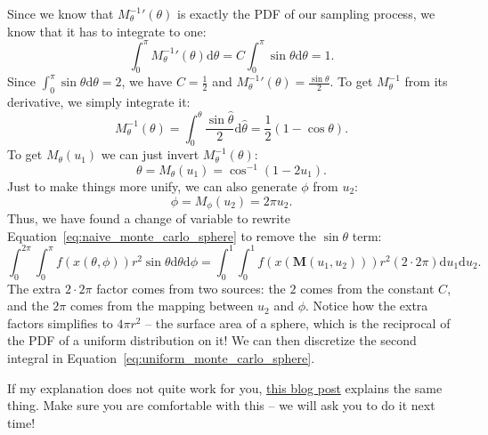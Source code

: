 Since we know that ${M_{\theta}^{-1}}'(\theta)$ is exactly the PDF of our sampling process, we know that it has to integrate to one:
\begin{equation}
\int_{0}^{\pi} {M_{\theta}^{-1}}'(\theta) \mathrm{d}\theta = C\int_{0}^{\pi} \sin\theta \mathrm{d}\theta = 1.
\label{eq:pdf_normalization}
\end{equation}
Since $\int_{0}^{\pi} \sin\theta \mathrm{d}\theta = 2$, we have $C = \frac{1}{2}$ and ${M_{\theta}^{-1}}'(\theta) = \frac{\sin\theta}{2}$. To get $M_{\theta}^{-1}$ from its derivative, we simply integrate it:
\begin{equation}
M_{\theta}^{-1}(\theta) = \int_{0}^{\theta} \frac{\sin\hat{\theta}}{2} \mathrm{d}\hat{\theta} = \frac{1}{2}\left(1 - \cos\theta\right).
\end{equation}
To get $M_{\theta}(u_1)$ we can just invert $M_{\theta}^{-1}(\theta)$:
\begin{equation}
\theta = M_{\theta}(u_1) = \cos^{-1}\left(1 - 2u_1\right).
\end{equation}
Just to make things more unify, we can also generate $\phi$ from $u_2$:
\begin{equation}
\phi = M_{\phi}(u_2) = 2\pi u_2.
\end{equation}
Thus, we have found a change of variable to rewrite Equation~\eqref{eq:naive_monte_carlo_sphere} to remove the $\sin\theta$ term:
\begin{equation}
    \int_{0}^{2\pi}\int_{0}^{\pi} f(x(\theta, \phi)) r^2 \sin\theta \mathrm{d}\theta \mathrm{d} \phi =
    \int_{0}^{1}\int_{0}^{1} f(x(\mathbf{M}(u_1, u_2))) r^2 (2 \cdot 2\pi) \mathrm{d}u_1 \mathrm{d}u_2.
    \label{eq:uniform_monte_carlo_sphere}
\end{equation}
The extra $2 \cdot 2\pi$ factor comes from two sources: the $2$ comes from the constant $C$, and the $2\pi$ comes from the mapping between $u_2$ and $\phi$. Notice how the extra factors simplifies to $4\pi r^2$ -- the surface area of a sphere, which is the reciprocal of the PDF of a uniform distribution on it! We can then discretize the second integral in Equation~\eqref{eq:uniform_monte_carlo_sphere}.

If my explanation does not quite work for you, \href{http://6degreesoffreedom.co/circle-random-sampling/}{this blog post} explains the same thing. Make sure you are comfortable with this -- we will ask you to do it next time!

